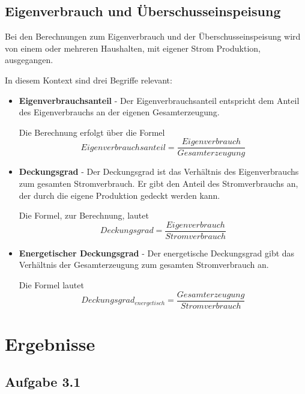 \documentclass[a4paper,12pt]{article}
\begin{document}
	\subsection{Eigenverbrauch und Überschusseinspeisung}
	Bei den Berechnungen zum Eigenverbrauch und der Überschusseinspeisung wird von einem oder mehreren Haushalten, mit eigener Strom Produktion, ausgegangen.\\ \par
	In diesem Kontext sind drei Begriffe relevant:
	\begin{itemize}
		\item \textbf{Eigenverbrauchsanteil} - Der Eigenverbrauchsanteil entspricht dem Anteil des Eigenverbrauchs an der eigenen Gesamterzeugung.\\ \par
		\noindent Die Berechnung erfolgt über die Formel
		\begin{equation}
		Eigenverbrauchsanteil=\frac{Eigenverbrauch}{Gesamterzeugung}
		\end{equation}
		\item \textbf{Deckungsgrad} - Der Deckungsgrad ist das Verhältnis des Eigenverbrauchs zum gesamten Stromverbrauch.
		Er gibt den Anteil des Stromverbrauchs an, der durch die eigene Produktion gedeckt werden kann.\\ \par
		\noindent Die Formel, zur Berechnung, lautet
		\begin{equation}
		Deckungsgrad=\frac{Eigenverbrauch}{Stromverbrauch}
		\end{equation}
		\item \textbf{Energetischer Deckungsgrad} - Der energetische Deckungsgrad gibt das Verhältnis der Gesamterzeugung zum gesamten Stromverbrauch an.\\ \par
		\noindent Die Formel lautet
		\begin{equation}
		Deckungsgrad_{energetisch}=\frac{Gesamterzeugung}{Stromverbrauch}
		\end{equation}
	\end{itemize}
	\newpage
	\section{Ergebnisse}
	\subsection{Aufgabe 3.1}
\end{document}
